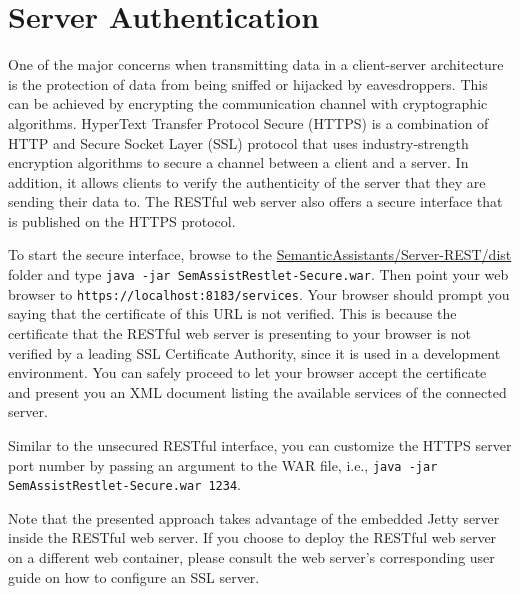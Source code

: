 \section{Server Authentication}
One of the major concerns when transmitting data in a client-server architecture is the protection of data from being sniffed or hijacked by eavesdroppers. This can be achieved by encrypting the communication channel with cryptographic algorithms. HyperText Transfer Protocol Secure (HTTPS) is a combination of HTTP and Secure Socket Layer (SSL) protocol that uses industry-strength encryption algorithms to secure a channel between a client and a server. In addition, it allows clients to verify the authenticity of the server that they are sending their data to. The \sa RESTful web server also offers a secure interface that is published on the HTTPS protocol. 

To start the secure interface, browse to the \url{SemanticAssistants/Server-REST/dist} folder and type \texttt{java -jar SemAssistRestlet-Secure.war}. Then point your web browser to \texttt{https://localhost:8183/services}. Your browser should prompt you saying that the certificate of this URL is not verified. This is because the certificate that the RESTful web server is presenting to your browser is not verified by a leading SSL Certificate Authority, since it is used in a development environment. You can safely proceed to let your browser accept the certificate and present you an XML document listing the available services of the connected \sa server. 

Similar to the \sa unsecured RESTful interface, you can customize the HTTPS server port number by passing an argument to the WAR file, i.e., \texttt{java -jar SemAssistRestlet-Secure.war 1234}.

Note that the presented approach takes advantage of the embedded Jetty server inside the \sa RESTful web server. If you choose to deploy the RESTful web server on a different web container, please consult the web server's corresponding user guide on how to configure an SSL server.
